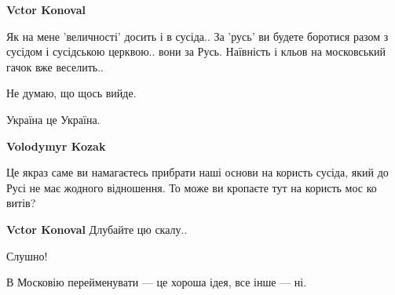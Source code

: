 \begin{itemize}
\begin{itemize}
 
\textbf{Vctor Konoval} 

Як на мене 'величності' досить і в сусіда.. За 'русь' ви будете боротися разом
з сусідом і сусідською церквою.. вони за Русь. Наївність і кльов на московський
гачок вже веселить..

Не думаю, що щось вийде.

Україна це Україна.

 
\textbf{Volodymyr Kozak} 

Це якраз саме ви намагаєтесь прибрати наші основи на користь сусіда, який до
Русі не має жодного відношення. То може ви кропаєте тут на користь мос ко
витів?


 
\textbf{Vctor Konoval} Длубайте цю скалу..

\end{itemize}

 
Слушно!

 
В Московію перейменувати — це хороша ідея, все інше — ні.

 


\end{itemize}
